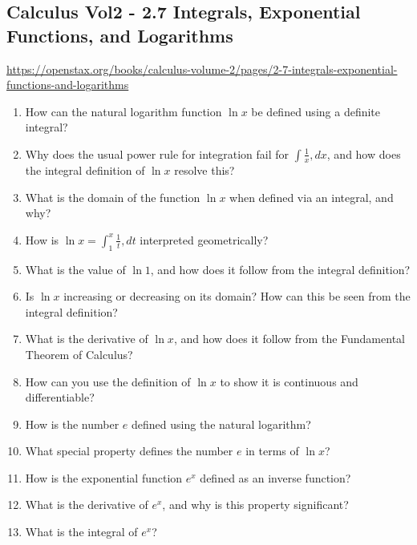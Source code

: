 \subsection{Calculus Vol2 - 2.7 Integrals, Exponential Functions, and Logarithms}

\url{https://openstax.org/books/calculus-volume-2/pages/2-7-integrals-exponential-functions-and-logarithms}

\begin{enumerate}

\item How can the natural logarithm function $\ln x$ be defined using a definite integral?

\item Why does the usual power rule for integration fail for $\int \frac{1}{x},dx$, and how does the integral definition of $\ln x$ resolve this?

\item What is the domain of the function $\ln x$ when defined via an integral, and why?

\item How is $\ln x = \int_1^x \frac{1}{t},dt$ interpreted geometrically?

\item What is the value of $\ln 1$, and how does it follow from the integral definition?

\item Is $\ln x$ increasing or decreasing on its domain? How can this be seen from the integral definition?

\item What is the derivative of $\ln x$, and how does it follow from the Fundamental Theorem of Calculus?

\item How can you use the definition of $\ln x$ to show it is continuous and differentiable?

\item How is the number $e$ defined using the natural logarithm?

\item What special property defines the number $e$ in terms of $\ln x$?

\item How is the exponential function $e^x$ defined as an inverse function?

\item What is the derivative of $e^x$, and why is this property significant?

\item What is the integral of $e^x$?


\end{enumerate}
